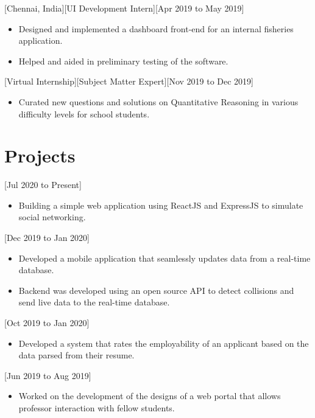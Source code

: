\documentclass{article}
\begin{document}
[Chennai, India][UI Development Intern][Apr 2019 to May 2019]
\begin{itemize}
\item Designed and implemented a dashboard front-end for an internal fisheries application.
\item Helped and aided in preliminary testing of the software. 
\end{itemize}

[Virtual Internship][Subject Matter Expert][Nov 2019 to Dec 2019]
\begin{itemize}
\item Curated new questions and solutions on Quantitative Reasoning in various difficulty levels for school students.
\end{itemize}
 
\section{Projects}
[Jul 2020 to Present]
\begin{itemize}
\item Building a simple web application using ReactJS and ExpressJS to simulate social networking.
\end{itemize}

[Dec 2019 to Jan 2020]
\begin{itemize}
\item Developed a mobile application that seamlessly updates data from a real-time database.
\item Backend was developed using an open source API to detect collisions and send live data to the real-time database.
\end{itemize}

[Oct 2019 to Jan 2020]
\begin{itemize}
\item Developed a system that rates the employability of an applicant based on the data parsed from their resume.
\end{itemize}

[Jun 2019 to Aug 2019]
\begin{itemize}
\item Worked on the development of the designs of a web portal that allows professor interaction with fellow students.
\end{itemize}
\end{document}
